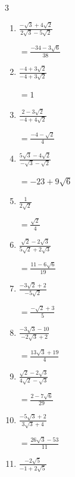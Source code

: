 \begin{multicols}{3}
\begin{enumerate}
        $\displaystyle =\frac{-7\sqrt{2}+10}{2}$

  \item $\displaystyle \frac{-\sqrt{3}+4\sqrt{2}}{2\sqrt{3}-5\sqrt{2}}$

        $\displaystyle =\frac{-34-3\sqrt{6}}{38}$

\columnbreak %

  \item $\displaystyle \frac{-4+3\sqrt{2}}{-4+3\sqrt{2}}$

        $\displaystyle =1$

  \item $\displaystyle \frac{2-3\sqrt{2}}{-4+4\sqrt{2}}$

        $\displaystyle =\frac{-4-\sqrt{2}}{4}$

  \item $\displaystyle \frac{5\sqrt{3}-4\sqrt{2}}{-\sqrt{3}-\sqrt{2}}$

        $\displaystyle =-23+9\sqrt{6}$

  \item $\displaystyle \frac{1}{2\sqrt{2}}$

        $\displaystyle =\frac{\sqrt{2}}{4}$

  \item $\displaystyle \frac{\sqrt{2}-2\sqrt{3}}{5\sqrt{2}+2\sqrt{3}}$

        $\displaystyle =\frac{11-6\sqrt{6}}{19}$

\columnbreak %

  \item $\displaystyle \frac{-3\sqrt{2}+2}{-5\sqrt{2}}$

        $\displaystyle =\frac{-\sqrt{2}+3}{5}$

  \item $\displaystyle \frac{-3\sqrt{3}-10}{-2\sqrt{3}+2}$

        $\displaystyle =\frac{13\sqrt{3}+19}{4}$

  \item $\displaystyle \frac{\sqrt{2}-2\sqrt{3}}{4\sqrt{2}-\sqrt{3}}$

        $\displaystyle =\frac{2-7\sqrt{6}}{29}$

  \item $\displaystyle \frac{-5\sqrt{3}+2}{3\sqrt{3}+4}$

        $\displaystyle =\frac{26\sqrt{3}-53}{11}$

  \item $\displaystyle \frac{-2\sqrt{5}}{-1+2\sqrt{5}}$


\end{enumerate}
\end{multicols}
